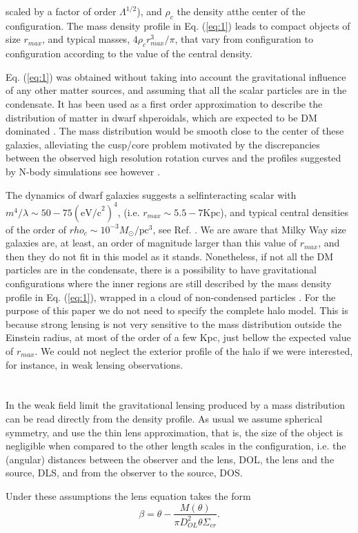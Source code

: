 \documentclass[10pt,twoside,twocolumn]{article}
\begin{document}
scaled by a factor of order $\Lambda^{1/2}$), and $\rho_c$ the density atthe center of the configuration. The mass density profile
in Eq. (\ref{eq:1}) leads to compact objects of size $r_{max}$, and typical masses, $4\rho_cr^3_{max}/\pi$, that vary from configuration to
configuration according to the value of the central density. \par
Eq. (\ref{eq:1}) was obtained without taking into account the
gravitational influence of any other matter sources, and assuming that all the scalar particles are in the condensate. It has been used as a first order approximation to describe the distribution of matter in dwarf shperoidals,
which are expected to be DM dominated \cite{6,8}. The mass distribution would be smooth close to the center of these
galaxies, alleviating the cusp/core problem motivated by the discrepancies between the observed high resolution
rotation curves and the profiles suggested by N-body simulations \cite{9} see however \cite{10}.\par
The dynamics of dwarf galaxies suggests a selfinteracting scalar with $m^4/\lambda\sim50-75(\text{eV/c}^2)^4$, (i.e. $r_{max}\sim5.5 - 7\text{Kpc}$), and typical central densities of the
order of $rho_c\sim10^{-3}M_{\odot}/\text{pc}^3$, see Ref. \cite{6}. We are aware
that Milky Way size galaxies are, at least, an order of
magnitude larger than this value of $r_{max}$, and then they
do not fit in this model as it stands. Nonetheless, if
not all the DM particles are in the condensate, there is
a possibility to have gravitational configurations where
the inner regions are still described by the mass density
profile in Eq. (\ref{eq:1}), wrapped in a cloud of non-condensed
particles \cite{11}. For the purpose of this paper we do not
need to specify the complete halo model. This is because
strong lensing is not very sensitive to the mass distribution outside the Einstein radius, at most of the order of
a few Kpc, just bellow the expected value of $r_{max}$. We
could not neglect the exterior profile of the halo if we were interested, for instance, in weak lensing observations.

    \section{}
In the weak field limit the gravitational lensing produced by a mass distribution can be read directly from the density profile. As usual we assume spherical symmetry, and use the thin lens approximation, that is, the size of the object is negligible when compared to the other length scales in the configuration, i.e. the (angular) distances between the observer and the lens, DOL, the lens
and the source, DLS, and from the observer to the source,
DOS. \par
Under these assumptions the lens equation takes the
form 
\begin{equation}
    \beta=\theta- \frac{M(\theta)}{\pi D^2_{OL}\theta\Sigma_{cr}}.
    \label{eq:2}
\end{equation}
\end{document}
